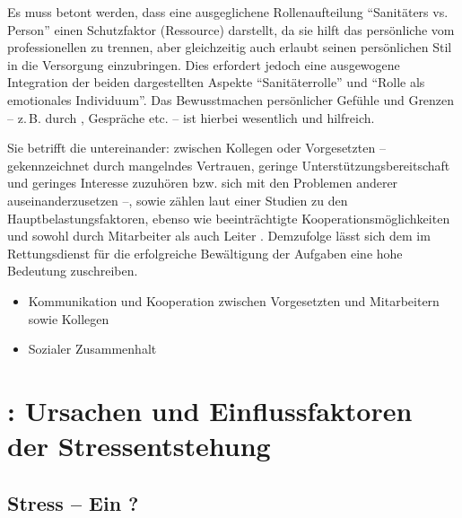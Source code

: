 {Es muss betont werden, dass eine ausgeglichene
Rollenaufteilung \enquote{Sanitäters vs. Person} einen
Schutzfaktor (Ressource) darstellt, da sie hilft das persönliche vom
professionellen zu trennen, aber gleichzeitig auch erlaubt
seinen persönlichen Stil in die Versorgung
einzubringen. Dies erfordert jedoch eine ausgewogene
Integration der beiden dargestellten Aspekte
\enquote{Sanitäterrolle} und \enquote{Rolle als emotionales Individuum}.
Das Bewusstmachen persönlicher Gefühle und Grenzen -- z.\,B.
durch , Gespräche etc. -- ist hierbei
wesentlich und hilfreich.}
{}
{}
{}
{}



{Sie betrifft die 
untereinander: 
zwischen Kollegen oder Vorgesetzten – gekennzeichnet durch
mangelndes Vertrauen, geringe Unterstützungsbereitschaft und
geringes Interesse zuzuhören bzw. sich mit den Problemen
anderer auseinanderzusetzen –,  sowie
 zählen laut
einer Studien zu den
Hauptbelastungsfaktoren, ebenso wie beeinträchtigte
Kooperationsmöglichkeiten und 
sowohl durch Mitarbeiter als auch Leiter . Demzufolge
lässt sich dem  im Rettungsdienst
für die
erfolgreiche Bewältigung der Aufgaben eine hohe Bedeutung
zuschreiben.}
{
\begin{itemize}
  \item Kommunikation und Kooperation zwischen
  Vorgesetzten und Mitarbeitern sowie Kollegen
  \item Sozialer Zusammenhalt
\end{itemize}
}
{}
{}
{}








\section{: Ursachen und Einflussfaktoren der 
Stressentstehung}

\label{topic:stress-ursachen}

\subsection{Stress -- Ein ?}

